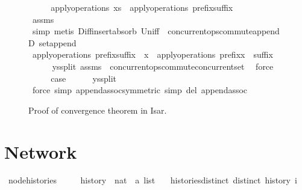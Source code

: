 \documentclass[acmlarge,review,anonymous]{acmart}\settopmatter{printfolios=true}
\begin{document}
\begin{figure}
\begin{isabellebody}
\ \ \isamarkupfalse%
\ \isamarkupfalse%
\ {\isachardoublequoteopen}apply{\isacharunderscore}operations\ xs\ {\isacharequal}\ apply{\isacharunderscore}operations\ {\isacharparenleft}prefix{\isacharat}suffix{\isacharparenright}{\isachardoublequoteclose}\isanewline
\ \ \ \ \isamarkupfalse%
\ assms\ \isamarkupfalse%
\ simp\ {\isacharparenleft}metis\ Diff{\isacharunderscore}insert{\isacharunderscore}absorb\ Un{\isacharunderscore}iff\ {\isacharasterisk}\ concurrent{\isacharunderscore}ops{\isacharunderscore}commute{\isacharunderscore}appendD\ set{\isacharunderscore}append{\isacharparenright}\isanewline
\ \ \isamarkupfalse%
\ \isamarkupfalse%
\ {\isachardoublequoteopen}apply{\isacharunderscore}operations\ {\isacharparenleft}prefix{\isacharat}suffix\ {\isacharat}\ {\isacharbrackleft}x{\isacharbrackright}{\isacharparenright}\ {\isacharequal}\ apply{\isacharunderscore}operations\ {\isacharparenleft}prefix{\isacharat}x\ {\isacharhash}\ suffix{\isacharparenright}{\isachardoublequoteclose}\isanewline
\ \ \ \ \isamarkupfalse%
\ ys{\isacharunderscore}split\ assms\ {\isacharasterisk}{\isacharasterisk}\ concurrent{\isacharunderscore}ops{\isacharunderscore}commute{\isacharunderscore}concurrent{\isacharunderscore}set\ \isamarkupfalse%
\ force\isanewline
\ \ \isamarkupfalse%
\ \isamarkupfalse%
\ {\isacharquery}case\isanewline
\ \ \ \ \isamarkupfalse%
\ ys{\isacharunderscore}split\ \isamarkupfalse%
\ {\isacharparenleft}force\ simp{\isacharcolon}\ append{\isacharunderscore}assoc{\isacharbrackleft}symmetric{\isacharbrackright}\ simp\ del{\isacharcolon}\ append{\isacharunderscore}assoc{\isacharparenright}\isanewline
{}\isamarkupfalse%
  \end{isabellebody}
  \caption{Proof of convergence theorem in Isar.}
  \label{fig.convergence}
\end{figure}



\section{Network}
\label{sect.network}

\begin{isabellebody}
\isanewline
{}\isamarkupfalse%
\ node{\isacharunderscore}histories\ {\isacharequal}\ \isanewline
\ \ \ history\ {\isacharcolon}{\isacharcolon}\ {\isachardoublequoteopen}nat\ {\isasymRightarrow}\ {\isacharprime}a\ list{\isachardoublequoteclose}\isanewline
\ \ \ histories{\isacharunderscore}distinct{\isacharcolon}\ {\isachardoublequoteopen}distinct\ {\isacharparenleft}history\ i{\isacharparenright}{\isachardoublequoteclose}\isanewline
\end{isabellebody}
\end{document}
